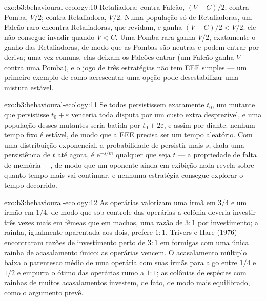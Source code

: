 \begin{solution}{exo:b3:behavioural-ecology:10}
Retaliadora: contra Falcão, $(V - C)/2$; contra Pomba, $V/2$; contra
Retaliadora, $V/2$. Numa população só de Retaliadoras, um Falcão raro
encontra Retaliadoras, que revidam, e ganha $(V - C)/2 < V/2$: ele não
consegue invadir quando $V < C$. Uma Pomba rara ganha $V/2$, exatamente o
ganho das Retaliadoras, de modo que as Pombas são neutras e podem entrar
por deriva; uma vez comuns, elas deixam os Falcões entrar (um Falcão
ganha $V$ contra uma Pomba), e o jogo de três estratégias não tem EEE
simples --- um primeiro exemplo de como acrescentar uma opção pode
desestabilizar uma mistura estável.
\end{solution}

\begin{solution}{exo:b3:behavioural-ecology:11}
Se todos persistissem exatamente $t_{0}$, um mutante que persistisse
$t_{0} +
\varepsilon$ venceria toda disputa por um custo extra
desprezível, e uma população desses mutantes seria batida por $t_{0} + 2\varepsilon$, e assim por diante: nenhum tempo fixo é estável, de modo
que a EEE precisa ser um tempo aleatório. Com uma distribuição
exponencial, a probabilidade de persistir mais $s$, dada uma persistência
de $t$ até agora, é $\mathrm{e}^{-s/m}$ qualquer que seja $t$ --- a
propriedade de falta de memória ---, de modo que um oponente ainda em
exibição nada revela sobre quanto tempo mais vai continuar, e nenhuma
estratégia consegue explorar o tempo decorrido.
\end{solution}

\begin{solution}{exo:b3:behavioural-ecology:12}
As operárias valorizam uma irmã em $3/4$ e um irmão em $1/4$, de modo que
sob controle das operárias a colônia deveria investir três vezes mais em
fêmeas que em machos, uma razão de $3{:}1$ por investimento; a rainha,
igualmente aparentada aos dois, prefere $1{:}1$. Trivers e Hare (1976)
encontraram razões de investimento perto de $3{:}1$ em formigas com uma
única rainha de acasalamento único: as operárias vencem. O acasalamento
múltiplo baixa o parentesco médio de uma operária com suas irmãs para
algo entre $1/4$ e $1/2$ e empurra o ótimo das operárias rumo a $1{:}1$;
as colônias de espécies com rainhas de muitos acasalamentos investem, de
fato, de modo mais equilibrado, como o argumento prevê.
\end{solution}

